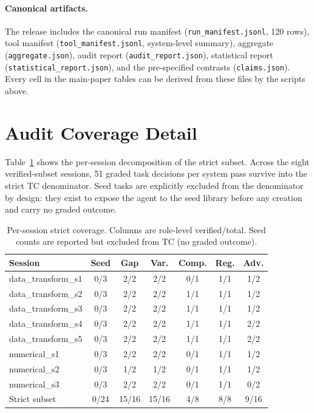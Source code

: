 \documentclass[sigconf,anonymous,review,natbib=false]{acmart}
\begin{document}
\paragraph{Canonical artifacts.}
The release includes the canonical run manifest
(\texttt{run\_manifest.jsonl}, 120 rows), tool manifest
(\texttt{tool\_manifest.jsonl}, system-level summary), aggregate
(\texttt{aggregate.json}), audit report
(\texttt{audit\_report.json}), statistical report
(\texttt{statistical\_report.json}), and the pre-specified contrasts
(\texttt{claims.json}). Every cell in the main-paper tables can be
derived from these files by the scripts above.

\section{Audit Coverage Detail}
\label{app:audit}

Table~\ref{tab:audit-detail} shows the per-session decomposition of
the strict subset. Across the eight verified-subset sessions, 51
graded task decisions per system pass survive into the strict TC
denominator. Seed tasks are explicitly excluded from the denominator
by design: they exist to expose the agent to the seed library before
any creation and carry no graded outcome.

\begin{table}[h]
\centering\footnotesize
\caption{Per-session strict coverage. Columns are role-level verified/total.
Seed counts are reported but excluded from TC (no graded outcome).}
\label{tab:audit-detail}
\begin{tabular}{lcccccc}
\toprule
\textbf{Session} & \textbf{Seed} & \textbf{Gap} & \textbf{Var.} & \textbf{Comp.} & \textbf{Reg.} & \textbf{Adv.} \\
\midrule
data\_transform\_s1 & 0/3 & 2/2 & 2/2 & 0/1 & 1/1 & 1/2 \\
data\_transform\_s2 & 0/3 & 2/2 & 2/2 & 1/1 & 1/1 & 1/2 \\
data\_transform\_s3 & 0/3 & 2/2 & 2/2 & 1/1 & 1/1 & 1/2 \\
data\_transform\_s4 & 0/3 & 2/2 & 2/2 & 1/1 & 1/1 & 2/2 \\
data\_transform\_s5 & 0/3 & 2/2 & 2/2 & 1/1 & 1/1 & 2/2 \\
numerical\_s1       & 0/3 & 2/2 & 2/2 & 0/1 & 1/1 & 1/2 \\
numerical\_s2       & 0/3 & 1/2 & 1/2 & 0/1 & 1/1 & 1/2 \\
numerical\_s3       & 0/3 & 2/2 & 2/2 & 0/1 & 1/1 & 0/2 \\
\midrule
Strict subset       & 0/24 & 15/16 & 15/16 & 4/8 & 8/8 & 9/16 \\
\bottomrule
\end{tabular}
\end{table}
\end{document}
